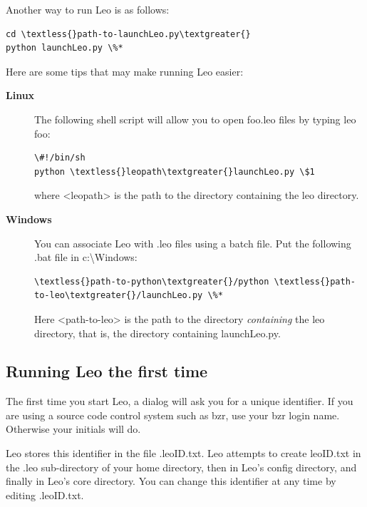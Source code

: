 \documentclass[a4paper,10pt,english]{sphinxmanual}
\begin{document}
Another way to run Leo is as follows:

\begin{Verbatim}[commandchars=\\\{\}]
cd \textless{}path-to-launchLeo.py\textgreater{}
python launchLeo.py \%*
\end{Verbatim}

Here are some tips that may make running Leo easier:
\begin{description}
\item[{\textbf{Linux}}] \leavevmode
The following shell script will allow you to open foo.leo files by typing leo foo:

\begin{Verbatim}[commandchars=\\\{\}]
\#!/bin/sh
python \textless{}leopath\textgreater{}launchLeo.py \$1
\end{Verbatim}

where \textless{}leopath\textgreater{} is the path to the directory containing the leo directory.

\item[{\textbf{Windows}}] \leavevmode
You can associate Leo with .leo files using a batch file. Put the
following .bat file in c:\textbackslash{}Windows:

\begin{Verbatim}[commandchars=\\\{\}]
\textless{}path-to-python\textgreater{}/python \textless{}path-to-leo\textgreater{}/launchLeo.py \%*
\end{Verbatim}

Here \textless{}path-to-leo\textgreater{} is the path to the directory \emph{containing} the leo directory,
that is, the directory containing launchLeo.py.

\end{description}


\subsection{Running Leo the first time}
\label{installing:running-leo-the-first-time}
The first time you start Leo, a dialog will ask you for a unique identifier. If
you are using a source code control system such as bzr, use your bzr login name.
Otherwise your initials will do.

Leo stores this identifier in the file .leoID.txt. Leo attempts to create
leoID.txt in the .leo sub-directory of your home directory, then in Leo's config
directory, and finally in Leo's core directory. You can change this identifier
at any time by editing .leoID.txt.
\end{document}
